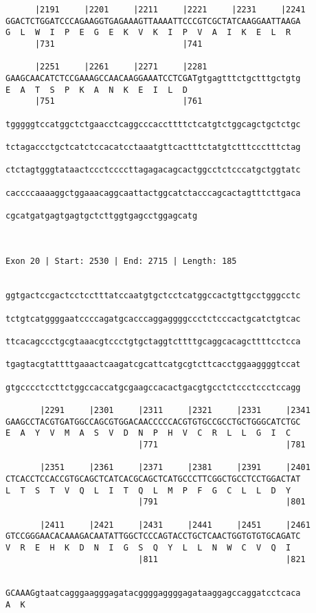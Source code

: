 \documentclass{article}
\begin{document}
\begin{Verbatim}
      |2191     |2201     |2211     |2221     |2231     |2241
GGACTCTGGATCCCAGAAGGTGAGAAAGTTAAAATTCCCGTCGCTATCAAGGAATTAAGA
G  L  W  I  P  E  G  E  K  V  K  I  P  V  A  I  K  E  L  R  
      |731                          |741                    
  
      |2251     |2261     |2271     |2281                   
GAAGCAACATCTCCGAAAGCCAACAAGGAAATCCTCGATgtgagtttctgctttgctgtg
E  A  T  S  P  K  A  N  K  E  I  L  D                       
      |751                          |761
  
tgggggtccatggctctgaacctcaggcccaccttttctcatgtctggcagctgctctgc

tctagaccctgctcatctccacatcctaaatgttcactttctatgtctttccctttctag

ctctagtgggtataactccctccccttagagacagcactggcctctcccatgctggtatc

caccccaaaaggctggaaacaggcaattactggcatctacccagcactagtttcttgaca

cgcatgatgagtgagtgctcttggtgagcctggagcatg
                                       

 
Exon 20 | Start: 2530 | End: 2715 | Length: 185


ggtgactccgactcctcctttatccaatgtgctcctcatggccactgttgcctgggcctc

tctgtcatggggaatccccagatgcacccaggaggggccctctcccactgcatctgtcac

ttcacagccctgcgtaaacgtccctgtgctaggtcttttgcaggcacagcttttcctcca

tgagtacgtattttgaaactcaagatcgcattcatgcgtcttcacctggaaggggtccat

gtgcccctccttctggccaccatgcgaagccacactgacgtgcctctccctccctccagg

       |2291     |2301     |2311     |2321     |2331     |2341
GAAGCCTACGTGATGGCCAGCGTGGACAACCCCCACGTGTGCCGCCTGCTGGGCATCTGC
E  A  Y  V  M  A  S  V  D  N  P  H  V  C  R  L  L  G  I  C  
                           |771                          |781
  
       |2351     |2361     |2371     |2381     |2391     |2401
CTCACCTCCACCGTGCAGCTCATCACGCAGCTCATGCCCTTCGGCTGCCTCCTGGACTAT
L  T  S  T  V  Q  L  I  T  Q  L  M  P  F  G  C  L  L  D  Y  
                           |791                          |801
  
       |2411     |2421     |2431     |2441     |2451     |2461
GTCCGGGAACACAAAGACAATATTGGCTCCCAGTACCTGCTCAACTGGTGTGTGCAGATC
V  R  E  H  K  D  N  I  G  S  Q  Y  L  L  N  W  C  V  Q  I  
                           |811                          |821
  
                                                            
GCAAAGgtaatcagggaagggagatacggggaggggagataaggagccaggatcctcaca
A  K                                                        
                                                            

\end{Verbatim}
\end{document}
